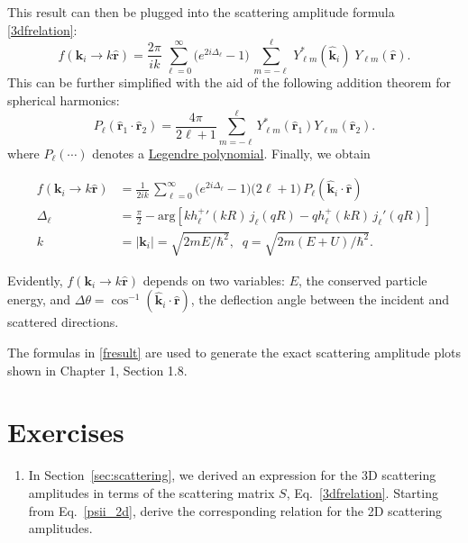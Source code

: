 \documentclass[prx,12pt]{revtex4-2}
\begin{document}
This result can then be plugged into the scattering amplitude formula
\eqref{3dfrelation}:
\begin{equation}
  f(\mathbf{k}_i\rightarrow k\hat{\mathbf{r}}) = \frac{2 \pi}{ik}\, \sum_{\ell =0}^\infty \big(e^{2i\Delta_\ell} - 1\big) \, \sum_{m=-\ell}^\ell \,Y_{\ell m}^*(\hat{\mathbf{k}}_i)\; Y_{\ell m}(\hat{\mathbf{r}}).
\end{equation}
This can be further simplified with the aid of the following addition
theorem for spherical harmonics:
\begin{equation}
  P_\ell(\hat{\mathbf{r}}_1\cdot\hat{\mathbf{r}}_2) = \frac{4\pi}{2\ell+1} \sum_{m=-\ell}^{\ell} Y_{\ell m}^*(\hat{\mathbf{r}}_1) Y_{\ell m}(\hat{\mathbf{r}}_2).
\end{equation}
where $P_\ell(\cdots)$ denotes a
\href{https://en.wikipedia.org/wiki/Legendre_polynomials}{Legendre
  polynomial}.  Finally, we obtain
\begin{framed}
\begin{equation}
  \begin{aligned}f(\mathbf{k}_i \rightarrow k\hat{\mathbf{r}}) &= \frac{1}{2ik}\, \sum_{\ell =0}^\infty \big(e^{2i\Delta_\ell} - 1\big) \big(2\ell+1\big)\, P_{\ell}(\hat{\mathbf{k}}_i\cdot \hat{\mathbf{r}}) \\ \Delta_\ell &= \frac{\pi}{2} - \mathrm{arg}\!\left[k{h_\ell^+}'(kR) \, j_\ell(qR) - qh_\ell^+(kR)\, j_\ell'(qR)\right] \\ k &= |\mathbf{k}_i| = \sqrt{2mE/\hbar^2}, \;\; q = \sqrt{2m(E+U)/\hbar^2}.\end{aligned}
  \label{fresult}
\end{equation}
\end{framed}
\noindent
Evidently, $f(\mathbf{k}_i \rightarrow k\hat{\mathbf{r}})$ depends on
two variables: $E$, the conserved particle energy, and $\Delta \theta
= \cos^{-1}(\hat{\mathbf{k}}_i\cdot \hat{\mathbf{r}})$, the deflection
angle between the incident and scattered directions.

The formulas in \eqref{fresult} are used to generate the exact
scattering amplitude plots shown in Chapter 1, Section 1.8.


\section*{Exercises}

\begin{enumerate}
\item \label{ex:2dscattering} In Section~\ref{sec:scattering}, we
  derived an expression for the 3D scattering amplitudes in terms of
  the scattering matrix $S$, Eq.~\eqref{3dfrelation}.  Starting from
  Eq.~\eqref{psii_2d}, derive the corresponding relation for the 2D
  scattering amplitudes.

\end{enumerate}
\end{document}
